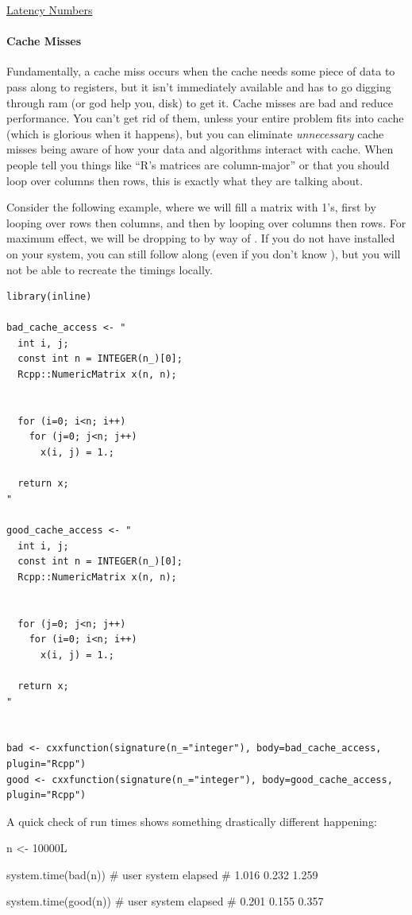 \href{http://www.eecs.berkeley.edu/~rcs/research/interactive_latency.html}{Latency Numbers}





\paragraph{Cache Misses} Fundamentally, a cache miss occurs when the cache needs some piece of data to pass along to registers, but it isn't immediately available and has to go digging through ram (or god help you, disk) to get it.  Cache misses are bad and reduce performance.  You can't get rid of them, unless your entire problem fits into cache (which is glorious when it happens), but you can eliminate \emph{unnecessary} cache misses being aware of how your data and algorithms interact with cache.  When people tell you things like ``R's matrices are column-major'' or that you should loop over columns then rows, this is exactly what they are talking about.

Consider the following example, where we will fill a matrix with 1's, first by looping over rows then columns, and then by looping over columns then rows.  For maximum effect, we will be dropping to \C by way of .  If you do not have  installed on your system, you can still follow along (even if you don't know \CXX), but you will not be able to recreate the timings locally.
\begin{lstlisting}
library(inline)

bad_cache_access <- "
  int i, j;
  const int n = INTEGER(n_)[0];
  Rcpp::NumericMatrix x(n, n);
  
  
  for (i=0; i<n; i++)
    for (j=0; j<n; j++)
      x(i, j) = 1.;
  
  return x;
"

good_cache_access <- "
  int i, j;
  const int n = INTEGER(n_)[0];
  Rcpp::NumericMatrix x(n, n);
  
  
  for (j=0; j<n; j++)
    for (i=0; i<n; i++)
      x(i, j) = 1.;
  
  return x;
"


bad <- cxxfunction(signature(n_="integer"), body=bad_cache_access, plugin="Rcpp")
good <- cxxfunction(signature(n_="integer"), body=good_cache_access, plugin="Rcpp")
\end{lstlisting}

A quick check of run times shows something drastically different happening:
\begin{Output}
n <- 10000L

system.time(bad(n))
#   user  system elapsed 
#  1.016   0.232   1.259 

system.time(good(n))
#   user  system elapsed 
#  0.201   0.155   0.357 
\end{Output}

